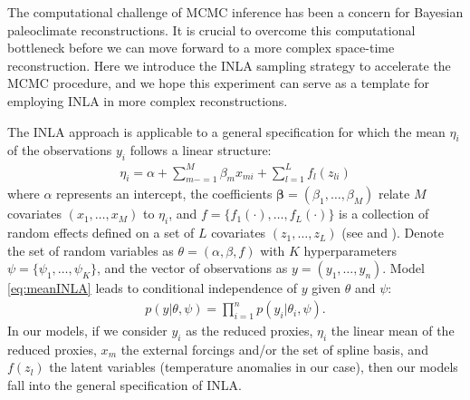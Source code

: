 \documentclass[12pt]{amsart}
\theoremstyle{plain}
\theoremstyle{definition}
\theoremstyle{remark}
\newcommand{\bl}[1]{\color{ForestGreen}\textbf{[Bo: #1]}\normalcolor}
\begin{document}
The computational challenge of MCMC inference has been a concern for Bayesian paleoclimate reconstructions. It is crucial to overcome this computational bottleneck before we can move forward to a more complex space-time reconstruction. Here we introduce the INLA sampling strategy to accelerate the MCMC procedure, and we hope this experiment can serve as a template for employing INLA in more complex reconstructions. 


The INLA approach is applicable to a general specification for which the mean $\eta_i$ of the observations $y_i$ follows a  linear structure:
\begin{align}\label{eq:meanINLA}
  \eta_i = \alpha +\sum_{m-=1}^M\beta_mx_{mi}+\sum_{l=1}^Lf_l(z_{li})
\end{align}
where $\alpha$ represents an intercept, the coefficients
$\mathbf{\beta} = (\beta_1,\ldots,\beta_M)$ relate $M$ covariates
$(x_1,\ldots,x_M)$ to $\eta_i$, and $f = \{f_1(\cdot),\ldots,f_L(\cdot)\}$ is a collection of
random effects defined on a set of $L$ covariates $(z_1,\ldots,z_L)$ (see
\cite{Rue2009} and \cite{Blangiardo2013}). 
Denote the set of random variables as
$\theta = (\alpha,\beta,f)$ with $K$ hyperparameters $\psi =
\{\psi_1,\ldots,\psi_K\}$, and the vector of observations as $y=(y_1,\ldots,y_n)$. Model \eqref{eq:meanINLA} leads to conditional independence of $y$ given $\theta$ and $\psi$:
\begin{align*}
  p(y|\theta,\psi)=\prod_{i=1}^np(y_i|\theta_i,\psi).
\end{align*}
In our models, if we consider $y_i$ as the reduced proxies,  $\eta_i$ the
linear mean of the reduced proxies, $x_m$ the external forcings and/or the set
of spline basis, and $f(z_l)$ the latent variables (temperature anomalies in
our case), then our models fall into the general specification of INLA. 
\end{document}
